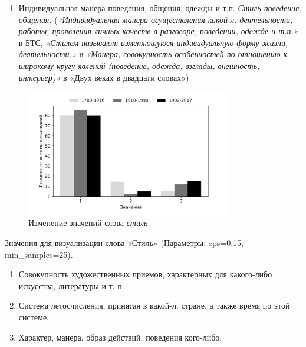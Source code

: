 \begin{enumerate}
    \item Индивидуальная манера поведения, общения, одежды и т.п. \textit{Стиль поведения, общения.}
(\textit{«Индивидуальная манера осуществления какой-л. деятельности, работы, проявления личных качеств в разговоре, поведении, одежде и т.п.»} в БТС,
\textit{«Стилем называют изменяющуюся индивидуальную форму жизни, деятельности.»} и \textit{«Манера, совокупность особенностей по отношению к широкому кругу явлений (поведение, одежда, взгляды, внешность, интерьер)»} в «Двух веках в двадцати словах»)


\end{enumerate}

\begin{figure}[H]
	\centering
	\includegraphics[width=0.8\textwidth]{img/visualizations/stil'_minimal}
	\caption{Изменение значений слова \textit{стиль}}
	\label{fig:Стиль_книга}
\end{figure}

Значения для визуализации слова «Стиль» (Параметры: eps=0.15, min\_samples=25).

\begin{enumerate}
    \item Совокупность художественных приемов, характерных для какого-либо искусства, литературы и т. п.
    \item Система летосчисления, принятая в какой-л. стране, а также время по этой системе.
    \item Характер, манера, образ действий, поведения кого-либо.
\end{enumerate}

